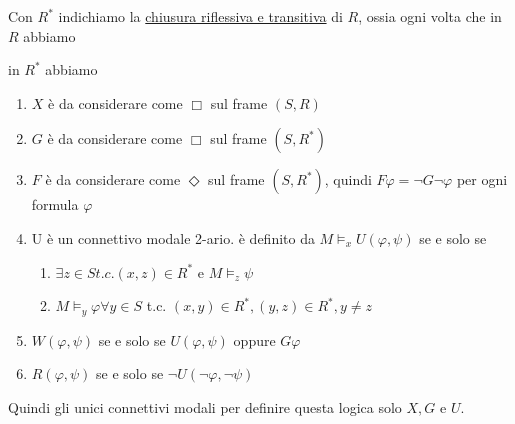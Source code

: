 \documentclass[../main.tex]{subfiles}
\begin{document}
Con $R^*$ indichiamo la \underline{chiusura riflessiva e transitiva} di $R$, ossia ogni volta che in $R$ abbiamo
\begin{center}
\end{center}
in $R^*$ abbiamo
\begin{center}
\end{center}
\begin{enumerate}[label=\arabic*)]
    \item $X$ è da considerare come $\Box$ sul frame $(S,R)$
    \item $G$ è da considerare come $\Box$ sul frame $(S,R^*)$
    \item $F$ è da considerare come $\Diamond$ sul frame $(S,R^*)$, quindi $F \varphi = \neg G \neg \varphi$ per ogni formula $\varphi$
    \item U è un connettivo modale 2-ario. è definito da $M \vDash_x U(\varphi, \psi)$ se e solo se
          \begin{enumerate}[label=\alph*)]
              \item $\exists z \in S t.c. (x,z) \in R^*$ e $M \vDash_z \psi$
              \item $M \vDash_y \varphi \forall y \in S$ t.c. $(x,y) \in R^*, (y,z) \in R^*, y \neq z$
          \end{enumerate}
    \item $W(\varphi, \psi)$ se e solo se $U(\varphi, \psi)$ oppure $G \varphi$
    \item $R(\varphi, \psi)$ se e solo se $\neg U(\neg \varphi, \neg \psi)$
\end{enumerate}
Quindi gli unici connettivi modali per definire questa logica solo $X, G$ e $U$.
\end{document}
